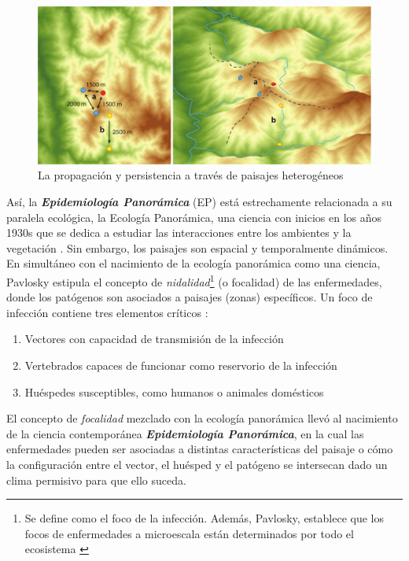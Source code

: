   \begin{figure}
  \centering%
  \includegraphics[width=1\textwidth]{images/paisajes_heterogeneos}%
  \caption{La propagación y persistencia a través de paisajes heterogéneos}\label{fig:paisajes_h}
  \end{figure}

  \par Así, la \textbf{\textit{Epidemiología Panorámica}}\cite{nidality, ostfeld_re_emerging}
  (EP) está estrechamente relacionada a su paralela ecológica, la Ecología
  Panorámica, una ciencia con inicios en los años 1930s que se dedica a estudiar
  las interacciones entre los ambientes y la vegetación \cite{landscape_ecology}.
  Sin embargo, los paisajes son espacial y temporalmente dinámicos.
  En simultáneo con el nacimiento de la ecología panorámica como una ciencia,
  Pavlosky estipula el concepto de \textit{nidalidad}\footnote{Se define como
  el foco de la infección. Además, Pavlosky, establece que los focos de
  enfermedades a microescala están determinados por todo el ecosistema \cite{nidality}}
  (o focalidad) de las enfermedades, donde los patógenos son asociados
  a paisajes (zonas) específicos. Un foco de infección contiene tres elementos
  críticos \cite{reisen_landscape}:
  \begin{enumerate}
    \item Vectores con capacidad de transmisión de la infección
    \item Vertebrados capaces de funcionar como reservorio de la infección
    \item Huéspedes susceptibles, como humanos o animales domésticos
  \end{enumerate}
  El concepto de \textit{focalidad} mezclado con la ecología panorámica
  llevó al nacimiento de la ciencia contemporánea
  \textbf{\textit{Epidemiología Panorámica}}, en la cual las enfermedades
  pueden ser asociadas a distintas características del paisaje o cómo
  la configuración entre el vector, el huésped y el patógeno se intersecan
  dado un clima permisivo para que ello suceda.

